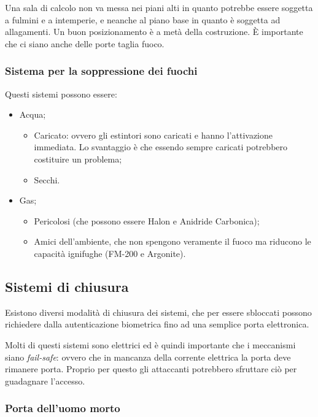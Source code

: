 Una sala di calcolo non va messa nei piani alti in quanto potrebbe essere 
soggetta a fulmini e a intemperie, e neanche al piano base in quanto è soggetta 
ad allagamenti. Un buon posizionamento è a metà della costruzione. È 
importante che ci siano anche delle porte taglia fuoco.

\subsubsection{Sistema per la soppressione dei fuochi}

Questi sistemi possono essere:
\begin{itemize}
\item Acqua;
\begin{itemize}
\item Caricato: ovvero gli estintori sono caricati e hanno l'attivazione 
immediata. Lo svantaggio è che essendo sempre caricati potrebbero costituire un 
problema;
\item Secchi.
\end{itemize}
\item Gas;
\begin{itemize}
\item Pericolosi (che possono essere Halon e Anidride Carbonica);
\item Amici dell'ambiente, che non spengono veramente il fuoco ma riducono le 
capacità ignifughe (FM-200 e Argonite).
\end{itemize}
\end{itemize}

\subsection{Sistemi di chiusura}

Esistono diversi modalità di chiusura dei sistemi, che per essere sbloccati 
possono richiedere dalla autenticazione biometrica fino ad una semplice 
porta elettronica.

Molti di questi sistemi sono elettrici ed è quindi importante che i 
meccanismi siano \textit{fail-safe}: ovvero che in mancanza della corrente 
elettrica la porta deve rimanere porta. Proprio per questo gli attaccanti 
potrebbero sfruttare ciò per guadagnare l'accesso.

\subsubsection{Porta dell'uomo morto}


